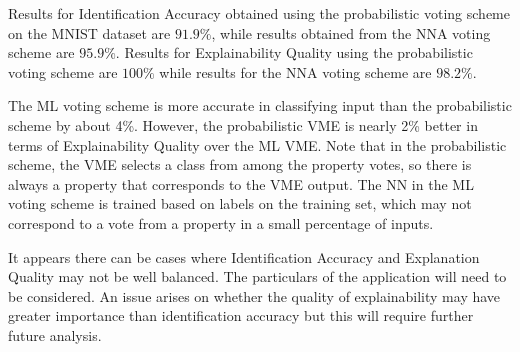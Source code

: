 \documentclass[conference]{IEEEtran}
\begin{document}
Results for Identification Accuracy obtained using the probabilistic voting scheme on the MNIST dataset are $91.9\%$, while results obtained from the NNA voting scheme are $95.9\%$.  Results for Explainability Quality using the probabilistic voting scheme are $100\%$ while results for the NNA voting scheme are $98.2\%$.

The ML voting scheme is more accurate in classifying input than the probabilistic scheme by about 4\%.   However, the probabilistic VME is nearly 2\% better in terms of Explainability Quality over the ML VME.  Note that in the probabilistic scheme, the VME selects a class from among the property votes, so there is always a property that corresponds to the VME output.  The NN in the ML voting scheme is trained based on labels on the training set, which may not correspond to a vote from a property in a small percentage of inputs.

It appears there can be cases where Identification Accuracy and Explanation Quality may not be well balanced.  The particulars of the application will need to be considered.  An issue arises on whether the quality of explainability may have greater importance than identification accuracy but this will require further future analysis.


{}
\end{document}
